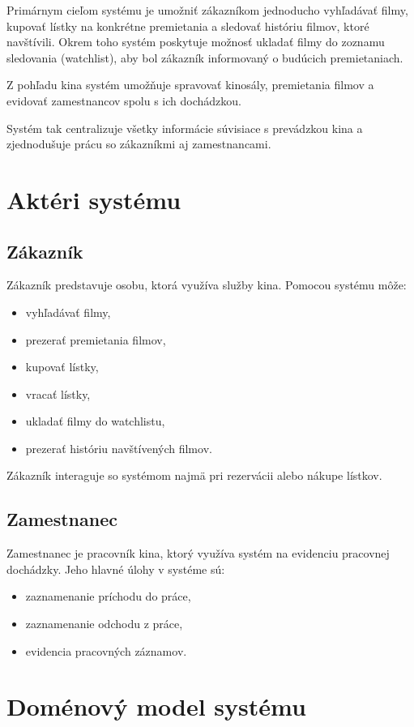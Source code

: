 \documentclass[11pt, a4paper]{article}
\begin{document}
Primárnym cieľom systému je umožniť zákazníkom jednoducho vyhľadávať filmy, kupovať
lístky na konkrétne premietania a sledovať históriu filmov, ktoré navštívili. Okrem toho
systém poskytuje možnosť ukladať filmy do zoznamu sledovania (watchlist), aby bol zákazník
informovaný o budúcich premietaniach.

Z pohľadu kina systém umožňuje spravovať kinosály, premietania filmov a evidovať
zamestnancov spolu s ich dochádzkou.

Systém tak centralizuje všetky informácie súvisiace s prevádzkou kina a zjednodušuje prácu
so zákazníkmi aj zamestnancami.

\section{Aktéri systému}
\label{sec:akteri}

\subsection{Zákazník}
Zákazník predstavuje osobu, ktorá využíva služby kina. Pomocou systému môže:
\begin{itemize}
    \item vyhľadávať filmy,
    \item prezerať premietania filmov,
    \item kupovať lístky,
    \item vracať lístky,
    \item ukladať filmy do watchlistu,
    \item prezerať históriu navštívených filmov.
\end{itemize}

Zákazník interaguje so systémom najmä pri rezervácii alebo nákupe lístkov.

\subsection{Zamestnanec}
Zamestnanec je pracovník kina, ktorý využíva systém na evidenciu pracovnej dochádzky.
Jeho hlavné úlohy v systéme sú:
\begin{itemize}
    \item zaznamenanie príchodu do práce,
    \item zaznamenanie odchodu z práce,
    \item evidencia pracovných záznamov.
\end{itemize}

\section{Doménový model systému}
\label{sec:domenovy-model}
\end{document}
